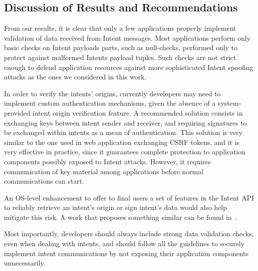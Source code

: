 \subsection{Discussion of Results and Recommendations}

From our results, it is clear that only a few applications properly implement validation of data received from Intent messages. Most applications perform only basic checks on Intent payloads parts, such as null-checks, performed only to protect against malformed Intents payload tuples. Such checks are not strict enough to defend application resources against more sophisticated Intent spoofing attacks as the ones we considered in this work.

In order to verify the intents' origins, currently developers may need to implement custom authentication mechanisms, given the absence of a system-provided intent origin verification feature. A recommended solution consists in exchanging keys between intent sender and receiver, and requiring signatures to be exchanged within intents as a mean of authentication. This solution is very similar to the one used in web application exchanging CSRF tokens, and it is very effective in practice, since it guarantees complete protection to application components possibly exposed to Intent attacks. However, it requires communication of key material among applications before normal communications can start.

An OS-level enhancement to offer to final users a set of features
in the Intent API to reliably retrieve an intent's origin or sign intent's data would also help mitigate this risk. A work that proposes something similar can be found in~\cite{quire2011}.

Most importantly, developers should always include strong data validation checks, even when dealing with intents, and should follow all the guidelines to securely implement intent communications by not exposing their application components unnecessarily.
